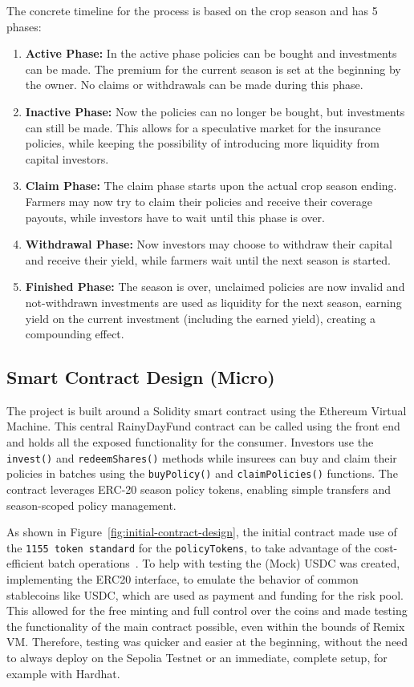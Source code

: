 \documentclass[11pt,a4paper]{article}
\begin{document}
		The concrete timeline for the process is based on the crop season and has 5 phases:
		\begin{enumerate}
			\item \textbf{Active Phase:} In the active phase policies can be bought and investments can be made.
				The premium for the current season is set at the beginning by the owner.
				No claims or withdrawals can be made during this phase.
			\item \textbf{Inactive Phase:} Now the policies can no longer be bought, but investments can still be made.
				This allows for a speculative market for the insurance policies, while keeping the possibility of introducing more liquidity from capital investors.
			\item \textbf{Claim Phase:} The claim phase starts upon the actual crop season ending.
				Farmers may now try to claim their policies and receive their coverage payouts, while investors have to wait until this phase is over.
			\item \textbf{Withdrawal Phase:} Now investors may choose to withdraw their capital and receive their yield, while farmers wait until the next season is started.
			\item \textbf{Finished Phase:} The season is over, unclaimed policies are now invalid and not-withdrawn investments are used as liquidity for the next season, earning yield on the current investment (including the earned yield), creating a compounding effect.
				\label{enum:phases}
		\end{enumerate}


		\subsection{Smart Contract Design (Micro)}\label{subsec:smart-contract-design}
		The project is built around a Solidity smart contract using the Ethereum Virtual Machine.
		This central RainyDayFund contract can be called using the front end and holds all the exposed functionality for the consumer.
		Investors use the \texttt{invest()} and \texttt{redeemShares()} methods while insurees can buy and claim their policies in batches using the \texttt{buyPolicy()} and \texttt{claimPolicies()} functions.
		The contract leverages ERC-20 season policy tokens, enabling simple transfers and season-scoped policy management.

		As shown in Figure~\ref{fig:initial-contract-design}, the initial contract made use of the \texttt{1155 token standard} for the \texttt{policyTokens}, to take advantage of the cost-efficient batch operations~\parencite{ERC1155}.
		To help with testing the (Mock) USDC was created, implementing the ERC20 interface, to emulate the behavior of common stablecoins like USDC, which are used as payment and funding for the risk pool.
		This allowed for the free minting and full control over the coins and made testing the functionality of the main contract possible, even within the bounds of Remix VM.
		Therefore, testing was quicker and easier at the beginning, without the need to always deploy on the Sepolia Testnet or an immediate, complete setup, for example with Hardhat.
\end{document}
